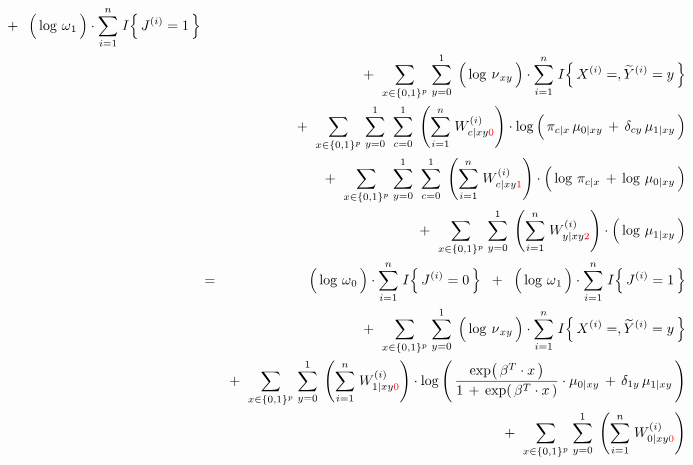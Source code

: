 \begin{enumerate}
\begin{eqnarray*}
	\;\; + \;\;
	\left(\,\log\,\overset{{\color{white}+}}{\omega}_{1}\,\right)\cdot\overset{n}{\underset{i=1}{\sum}}\; I\!\left\{\,J^{(i)}=1\,\right\}
\\
&&
	+ \;\;
	\underset{x\in\{0,1\}^{p}}{\sum}\;
	\overset{1}{\underset{y=0}{\sum}}\;
		\left(\,\log\,\overset{{\color{white}+}}{\nu}_{xy}\,\right)
		\cdot
		\overset{n}{\underset{i=1}{\sum}}\; I\!\left\{\,X^{(i)}=,\widetilde{Y}^{(i)}=y\,\right\}
\\
&&
	+ \;\;
	\underset{x\in\{0,1\}^{p}}{\sum}\;
	\overset{1}{\underset{y=0}{\sum}}\;\;
	\overset{1}{\underset{c=0}{\sum}}\;
	\left(\overset{n}{\underset{i=1}{\sum}}\;W^{(i)}_{c \vert xy{\color{red}0}}\right)
	\cdot
	\log\left(\,
		\pi_{c \vert x}\,\mu_{0 \vert xy}
		\,\overset{{\color{white}.}}{+}\,
		\delta_{cy}\,\mu_{1\vert xy}
		\,\right)
\\
&&
	+ \;\;
	\underset{x\in\{0,1\}^{p}}{\sum}\;
	\overset{1}{\underset{y=0}{\sum}}\;\;
	\overset{1}{\underset{c=0}{\sum}}\;
	\left(\overset{n}{\underset{i=1}{\sum}}\;W^{(i)}_{c \vert xy{\color{red}1}}\right)
	\cdot
	\left(\,
		\log\,\pi_{c \vert x}
		\,\overset{{\color{white}.}}{+}\,
		\log\,\mu_{0\vert xy}
	\,\right)
\\
&&
	+ \;\;
	\underset{x\in\{0,1\}^{p}}{\sum}\;
	\overset{1}{\underset{y=0}{\sum}}\;
	\left(\overset{n}{\underset{i=1}{\sum}}\;W^{(i)}_{y \vert xy{\color{red}2}}\right)
	\cdot
	\left(\,\log\,\overset{{\color{white}.}}{\mu}_{1 \vert xy}\,\right)
\\
&=&
	{\color{white}+} \;\;
	\left(\,\log\,\overset{{\color{white}+}}{\omega}_{0}\,\right)\cdot\overset{n}{\underset{i=1}{\sum}}\; I\!\left\{\,J^{(i)}=0\,\right\}
	\;\; + \;\;
	\left(\,\log\,\overset{{\color{white}+}}{\omega}_{1}\,\right)\cdot\overset{n}{\underset{i=1}{\sum}}\; I\!\left\{\,J^{(i)}=1\,\right\}
\\
&&
	+ \;\;
	\underset{x\in\{0,1\}^{p}}{\sum}\;
	\overset{1}{\underset{y=0}{\sum}}\;
		\left(\,\log\,\overset{{\color{white}+}}{\nu}_{xy}\,\right)
		\cdot
		\overset{n}{\underset{i=1}{\sum}}\; I\!\left\{\,X^{(i)}=,\widetilde{Y}^{(i)}=y\,\right\}
\\
&&
	+ \;\;
	\underset{x\in\{0,1\}^{p}}{\sum}\;
	\overset{1}{\underset{y=0}{\sum}}\;
	\left(\overset{n}{\underset{i=1}{\sum}}\;W^{(i)}_{1 \vert xy{\color{red}0}}\right)
	\cdot
	\log\left(\,
		\logisticBetaX
		\cdot
		\mu_{0 \vert xy}
		\,\overset{{\color{white}.}}{+}\,
		\delta_{1y}\,\mu_{1\vert xy}
		\,\right)
\\
&&
	+ \;\;
	\underset{x\in\{0,1\}^{p}}{\sum}\;
	\overset{1}{\underset{y=0}{\sum}}\;
	\left(\overset{n}{\underset{i=1}{\sum}}\;W^{(i)}_{0 \vert xy{\color{red}0}}\right)

\end{eqnarray*}
\end{enumerate}
